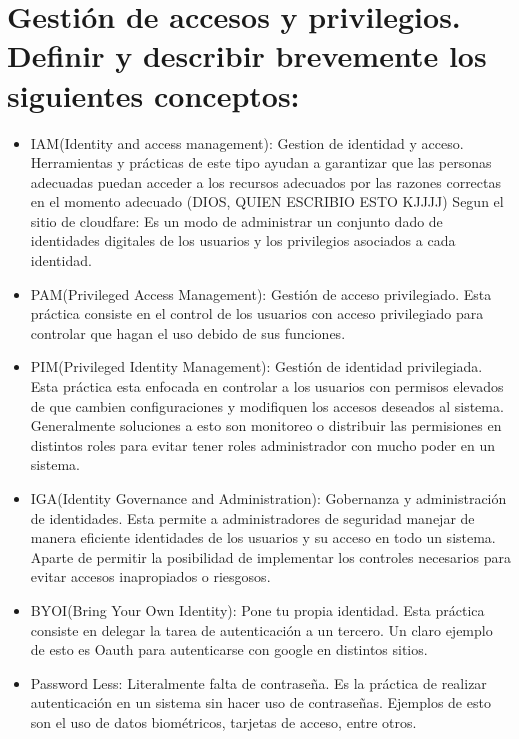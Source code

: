 \documentclass{article}
\begin{document}
	\section{Gestión de accesos y privilegios. Definir y describir brevemente los siguientes conceptos:}
	\begin{itemize}
		\item IAM(Identity and access management): Gestion de identidad y acceso. Herramientas y prácticas de este tipo ayudan a garantizar que las personas adecuadas puedan acceder a los recursos adecuados por las razones correctas en el momento adecuado (DIOS, QUIEN ESCRIBIO ESTO KJJJJ)
		Segun el sitio de cloudfare: Es un modo de administrar un conjunto dado de identidades digitales de los usuarios y los privilegios asociados a cada identidad.
		
		\item PAM(Privileged Access Management): Gestión de acceso privilegiado. Esta práctica consiste en el control de los usuarios con acceso privilegiado para controlar que hagan el uso debido de sus funciones.
		
		\item PIM(Privileged Identity Management): Gestión de identidad privilegiada. Esta práctica esta enfocada en controlar a los usuarios con permisos elevados de que cambien configuraciones y modifiquen los accesos deseados al sistema. Generalmente soluciones a esto son monitoreo o distribuir las permisiones en distintos roles para evitar tener roles administrador con mucho poder en un sistema.

		\item IGA(Identity Governance and Administration): Gobernanza y administración de identidades. Esta permite a administradores de seguridad manejar de manera eficiente identidades de los usuarios y su acceso en todo un sistema. Aparte de permitir la posibilidad de implementar los controles necesarios para evitar accesos inapropiados o riesgosos.
		
		\item BYOI(Bring Your Own Identity): Pone tu propia identidad. Esta práctica consiste en delegar la tarea de autenticación a un tercero. Un claro ejemplo de esto es Oauth para autenticarse con google en distintos sitios.
		
		\item Password Less: Literalmente falta de contraseña. Es la práctica de realizar autenticación en un sistema sin hacer uso de contraseñas. Ejemplos de esto son el uso de datos biométricos, tarjetas de acceso, entre otros. 
		

\end{itemize}
\end{document}

